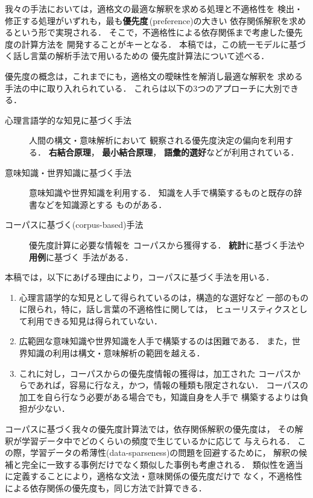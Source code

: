 我々の手法においては，適格文の最適な解釈を求める処理と不適格性を
検出・修正する処理がいずれも，最も{\bf 優先度}\,(preference)の大きい
依存関係解釈を求めるという形で実現される．
そこで，不適格性による依存関係まで考慮した優先度の計算方法を
開発することがキーとなる．
本稿では，この統一モデルに基づく話し言葉の解析手法で用いるための
優先度計算法について述べる．

優先度の概念は，これまでにも，適格文の曖昧性を解消し最適な解釈を
求める手法の中に取り入れられている．
これらは以下の3つのアプローチに大別できる．
\begin{description}
  \item[心理言語学的な知見に基づく手法] 人間の構文・意味解析において
観察される優先度決定の偏向を利用する．
{\bf 右結合原理}\cite{Kimball:Cog-2-1-15}，
{\bf 最小結合原理}\cite{Frazier:Cog-6-291}，
{\bf 語彙的選好}\cite{Ford:MRO-82-727}などが利用されている．
  \item[意味知識・世界知識に基づく手法] 意味知識や世界知識を利用する．
知識を人手で構築するもの\cite{Wilks:AI-6-53,Hirst:SIA-87,
Hobbs:AI-63-69}と既存の辞書などを知識源とする
もの\cite{Jensen:CL-13-3-251}がある．
  \item[コーパスに基づく(corpus-based)手法] 優先度計算に必要な情報を
コーパスから獲得する．
{\bf 統計}に基づく手法\cite{Jelinek:IBM-RC16374,Pereira:ACL92-128,
Hindle:CL-19-1-103,Resnik:ARPA93}や{\bf 用例}に基づく
手法\cite{佐藤:人知-6-4-592,Sumita:IEICE-E75-D-4-585,
Furuse:COLING92-645}がある．
\end{description}

本稿では，以下にあげる理由により，コーパスに基づく手法を用いる．
\begin{enumerate}
\renewcommand{\theenumi}{}
\renewcommand{\labelenumi}{}
  \item 心理言語学的な知見として得られているのは，構造的な選好など
一部のものに限られ，特に，話し言葉の不適格性に関しては，
ヒューリスティクスとして利用できる知見は得られていない．
  \item 広範囲な意味知識や世界知識を人手で構築するのは困難である．
また，世界知識の利用は構文・意味解析の範囲を越える．
  \item これに対し，コーパスからの優先度情報の獲得は，加工された
コーパスからであれば，容易に行なえ，かつ，情報の種類も限定されない．
コーパスの加工を自ら行なう必要がある場合でも，知識自身を人手で
構築するよりは負担が少ない．
\end{enumerate}

コーパスに基づく我々の優先度計算法では，依存関係解釈の優先度は，
その解釈が学習データ中でどのくらいの頻度で生じているかに応じて
与えられる．
この際，学習データの希薄性(data-sparseness)の問題を回避するために，
解釈の候補と完全に一致する事例だけでなく類似した事例も考慮される．
類似性を適当に定義することにより，適格な文法・意味関係の優先度だけで
なく，不適格性による依存関係の優先度も，同じ方法で計算できる．

